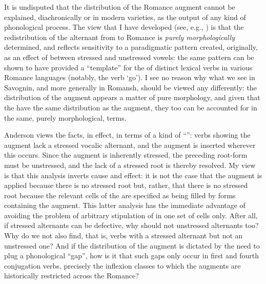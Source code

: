 \documentclass[output=paper,
modfonts
]{LSP/langsci}
\begin{document}
\largerpage
It is undisputed that the distribution of the Romance augment cannot be
explained, diachronically or in modern varieties, as the output of any
kind of phonological process. The view that I have developed (see, e.g.,
\citealt{maiden2005,maiden2011a,maiden2011c}) is that the redistribution of the alternant
from  to Romance is \emph{purely morphologically} determined, and
reflects sensitivity to a paradigmatic pattern created, originally, as
an effect of  between stressed and unstressed
vowels: the same pattern can be shown to have provided a ``template'' for
the   of distinct lexical verbs in various Romance
languages (notably, the verb `go'). I see no reason why what we see in
Savognin, and more generally in Romansh, should be viewed any
differently: the distribution of the augment appears a matter of pure
morphology, and given that the  have the same
distribution as the augment, they too can be accounted for in the same,
purely morphological, terms.

Anderson views the facts, in effect, in terms of a kind of
``'': verbs showing the augment lack a stressed vocalic
alternant, and the augment is inserted wherever this occurs. Since the
augment is inherently stressed, the preceding root-form must be
unstressed, and the lack of a stressed root  is thereby
resolved. My view is that this analysis inverts cause and effect: it is
not the case that the augment is applied because there is no stressed
root  but, rather, that there is no stressed root 
because the relevant cells of the  are specified as being filled
by forms containing the augment. This latter analysis has the immediate
advantage of avoiding the problem of arbitrary stipulation of
 in one set of cells only. After all, if stressed
alternants can be defective, why should not unstressed alternants too?
Why do we not also find, that is, verbs with a stressed alternant but
not an unstressed one? And if the distribution of the augment is
dictated by the need to plug a phonological ``gap'', how is it that such
gaps only occur in first and fourth conjugation verbs, precisely the
inflexion classes to which the augments are historically restricted
across the Romance?
\end{document}
